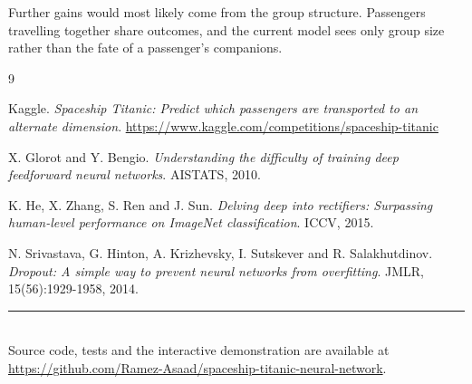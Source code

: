 \documentclass[11pt,a4paper]{article}
\begin{document}
Further gains would most likely come from the group structure. Passengers
travelling together share outcomes, and the current model sees only group size
rather than the fate of a passenger's companions.

\begin{thebibliography}{9}

Kaggle. \emph{Spaceship Titanic: Predict which passengers are transported to an
alternate dimension}. \url{https://www.kaggle.com/competitions/spaceship-titanic}

X. Glorot and Y. Bengio. \emph{Understanding the difficulty of training deep
feedforward neural networks}. AISTATS, 2010.

K. He, X. Zhang, S. Ren and J. Sun. \emph{Delving deep into rectifiers:
Surpassing human-level performance on ImageNet classification}. ICCV, 2015.

N. Srivastava, G. Hinton, A. Krizhevsky, I. Sutskever and R. Salakhutdinov.
\emph{Dropout: A simple way to prevent neural networks from overfitting}. JMLR,
15(56):1929-1958, 2014.

\end{thebibliography}

\vspace{1em}
\noindent\rule{\textwidth}{0.4pt}\\
\small
Source code, tests and the interactive demonstration are available at
\url{https://github.com/Ramez-Asaad/spaceship-titanic-neural-network}.
\end{document}
